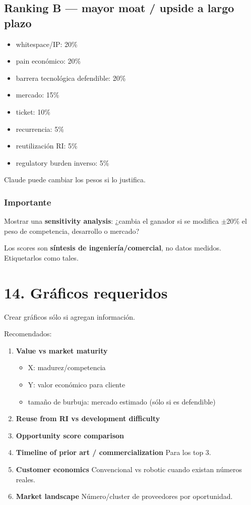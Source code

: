 \documentclass[11pt,a4paper]{article}
\begin{document}
\subsection*{Ranking B — mayor moat / upside a largo plazo}
\begin{itemize}
\item whitespace/IP: 20\%
\item pain económico: 20\%
\item barrera tecnológica defendible: 20\%
\item mercado: 15\%
\item ticket: 10\%
\item recurrencia: 5\%
\item reutilización RI: 5\%
\item regulatory burden inverso: 5\%
\end{itemize}

Claude puede cambiar los pesos si lo justifica.


\subsubsection*{Importante}
Mostrar una \textbf{sensitivity analysis}:
¿cambia el ganador si se modifica $\pm$20\% el peso de competencia, desarrollo o mercado?

Los scores son \textbf{síntesis de ingeniería/comercial}, no datos medidos. Etiquetarlos como tales.


\section*{14. Gráficos requeridos}
Crear gráficos sólo si agregan información.

Recomendados:

\begin{enumerate}
\item \textbf{Value vs market maturity}
\begin{itemize}
\item X: madurez/competencia
\item Y: valor económico para cliente
\item tamaño de burbuja: mercado estimado (sólo si es defendible)
\end{itemize}
\item \textbf{Reuse from RI vs development difficulty}
\item \textbf{Opportunity score comparison}
\item \textbf{Timeline of prior art / commercialization}
Para los top 3.
\item \textbf{Customer economics}
Convencional vs robotic cuando existan números reales.
\item \textbf{Market landscape}
Número/cluster de proveedores por oportunidad.
\end{enumerate}
\end{document}
